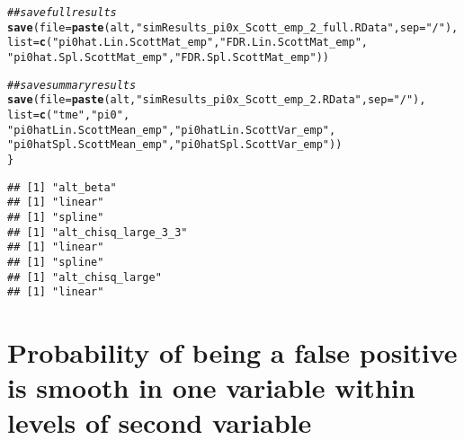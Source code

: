\documentclass{article}\usepackage[]{graphicx}\usepackage[]{color}
\makeatletter
\newcommand{\hlstr}[1]{\textcolor[rgb]{0.192,0.494,0.8}{#1}}%
\newcommand{\hlcom}[1]{\textcolor[rgb]{0.678,0.584,0.686}{\textit{#1}}}%
\newcommand{\hlstd}[1]{\textcolor[rgb]{0.345,0.345,0.345}{#1}}%
\newcommand{\hlkwc}[1]{\textcolor[rgb]{0.333,0.667,0.333}{#1}}%
\newcommand{\hlkwd}[1]{\textcolor[rgb]{0.737,0.353,0.396}{\textbf{#1}}}%
\newenvironment{kframe}{%
 \def\at@end@of@kframe{}%
 \ifinner\ifhmode%
  \def\at@end@of@kframe{\end{minipage}}%
  \begin{minipage}{\columnwidth}%
 \fi\fi%
 \def\FrameCommand##1{\hskip\@totalleftmargin \hskip-\fboxsep
 \colorbox{shadecolor}{##1}\hskip-\fboxsep
     \hskip-\linewidth \hskip-\@totalleftmargin \hskip\columnwidth}%
 \MakeFramed {\advance\hsize-\width
   \@totalleftmargin\z@ \linewidth\hsize
   \@setminipage}}%
 {\par\unskip\endMakeFramed%
 \at@end@of@kframe}
\newenvironment{knitrout}{}{} %
\makeatother
\begin{document}
\begin{knitrout}
\begin{kframe}
\begin{alltt}
  \hlcom{##save full results}
  \hlkwd{save}\hlstd{(}\hlkwc{file}\hlstd{=}\hlkwd{paste}\hlstd{(alt,}\hlstr{"simResults_pi0x_Scott_emp_2_full.RData"}\hlstd{,}\hlkwc{sep}\hlstd{=}\hlstr{"/"}\hlstd{),}
       \hlkwc{list}\hlstd{=}\hlkwd{c}\hlstd{(}\hlstr{"pi0hat.Lin.ScottMat_emp"}\hlstd{,} \hlstr{"FDR.Lin.ScottMat_emp"}\hlstd{,}
              \hlstr{"pi0hat.Spl.ScottMat_emp"}\hlstd{,} \hlstr{"FDR.Spl.ScottMat_emp"}\hlstd{))}

  \hlcom{##save summary results}
  \hlkwd{save}\hlstd{(}\hlkwc{file}\hlstd{=}\hlkwd{paste}\hlstd{(alt,}\hlstr{"simResults_pi0x_Scott_emp_2.RData"}\hlstd{,}\hlkwc{sep}\hlstd{=}\hlstr{"/"}\hlstd{),}
       \hlkwc{list}\hlstd{=}\hlkwd{c}\hlstd{(}\hlstr{"tme"}\hlstd{,} \hlstr{"pi0"}\hlstd{,}
              \hlstr{"pi0hatLin.ScottMean_emp"}\hlstd{,} \hlstr{"pi0hatLin.ScottVar_emp"}\hlstd{,}
              \hlstr{"pi0hatSpl.ScottMean_emp"}\hlstd{,} \hlstr{"pi0hatSpl.ScottVar_emp"}\hlstd{))}
\hlstd{\}}
\end{alltt}
\begin{verbatim}
## [1] "alt_beta"
## [1] "linear"
## [1] "spline"
## [1] "alt_chisq_large_3_3"
## [1] "linear"
## [1] "spline"
## [1] "alt_chisq_large"
## [1] "linear"
\end{verbatim}


{\ttfamily\noindent\color{warningcolor}{\#\# Warning in apply(as.matrix(pi0hatScottMat), 2, as.numeric): NAs introduced by coercion}}

{\ttfamily\noindent\color{warningcolor}{\#\# Warning in apply(as.matrix(pi0hatScottMat), 2, as.numeric): NAs introduced by coercion}}

{\ttfamily\noindent\color{warningcolor}{\#\# Warning in apply(as.matrix(pi0hatScottMat), 2, as.numeric): NAs introduced by coercion}}

{\ttfamily\noindent\color{warningcolor}{\#\# Warning in apply(as.matrix(pi0hatScottMat), 2, as.numeric): NAs introduced by coercion}}

{\ttfamily\noindent\color{warningcolor}{\#\# Warning in apply(as.matrix(pi0hatScottMat), 2, as.numeric): NAs introduced by coercion}}

{\ttfamily\noindent\bfseries\color{errorcolor}{\#\# Error in apply(as.matrix(pi0hatScottMat), 2, as.numeric): (list) object cannot be coerced to type 'double'}}\end{kframe}
\end{knitrout}

\section{Probability of being a false positive is smooth in one variable within levels of second variable}
\end{document}
